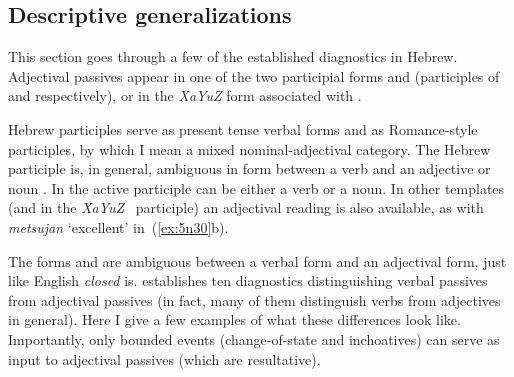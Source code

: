 \begin{exe}
\begin{xlist}
\begin{exe}
\begin{xlist}
\begin{exe}
\begin{exe}
\begin{xlist}
\begin{exe}
\begin{exe}
\begin{xlist}
\begin{exe}
\begin{xlist}
\begin{exe}
\begin{xlist}
\begin{exe}
\begin{xlist}
\begin{xlist}
\begin{exe}
\begin{xlist}
\begin{exe}
\begin{xlist}
\begin{exe}
\begin{exe}
\begin{exe}
\begin{xlist}
\begin{exe}
	\subsection{Descriptive generalizations} \label{passn:adjpass:mpua}
This section goes through a few of the established diagnostics in Hebrew. Adjectival passives appear in one of the two  participial forms {\mpua} and {\mhuf} (participles of {\tpua} and {\thuf} respectively), or in the \emph{XaYuZ} form associated with \tkal.

Hebrew participles serve as present tense verbal forms and as Romance-style participles, by which I mean a mixed nominal-adjectival category. The Hebrew participle is, in general, ambiguous in form between a verb and an adjective or noun \citep{boneh13tense,doron13ehll}. In {\tkal} the active participle can be either a verb or a noun. In other templates (and in the \emph{XaYuZ}~ participle) an adjectival reading is also available, as with \emph{metsujan} `excellent' in~(\ref{ex:5n30}b).
 \begin{exe}
 \ex  \label{ex:5n30}
 \begin{xlist} 
	
	
	
 \z
\z 

The forms {\mpua} and {\mhuf} are ambiguous between a verbal form and an adjectival form, just like English \emph{closed} is. \cite{doron00} establishes ten diagnostics distinguishing verbal passives from adjectival passives (in fact, many of them distinguish verbs from adjectives in general). Here I give a few examples of what these differences look like. Importantly, only bounded events (change-of-state and inchoatives) can serve as input to adjectival passives (which are resultative).


\end{xlist}
\end{exe}
\end{exe}
\end{xlist}
\end{exe}
\end{exe}
\end{exe}
\end{xlist}
\end{exe}
\end{xlist}
\end{exe}
\end{xlist}
\end{xlist}
\end{exe}
\end{xlist}
\end{exe}
\end{xlist}
\end{exe}
\end{xlist}
\end{exe}
\end{exe}
\end{xlist}
\end{exe}
\end{exe}
\end{xlist}
\end{exe}
\end{xlist}
\end{exe}
